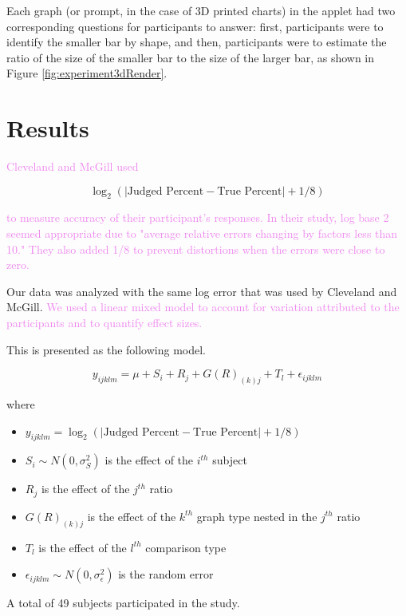 \documentclass[letterpaper,inpress,dvipsnames]{jdsart}
\begin{document}
Each graph (or prompt, in the case of 3D printed charts) in the applet had two corresponding questions for participants to answer: first, participants were to identify the smaller bar by shape, and then, participants were to estimate the ratio of the size of the smaller bar to the size of the larger bar, as shown in Figure \ref{fig:experiment3dRender}.

\hypertarget{results}{%
\section{Results}\label{results}}

{\textcolor{Violet}{Cleveland and McGill used }}

\[\log_2(|\text{Judged Percent} - \text{True Percent}|+1/8)\]

{\textcolor{Violet}{to measure accuracy of their participant's responses. In their study, log base 2 seemed appropriate due to "average relative errors changing by factors less than 10." They also added 1/8 to prevent distortions when the errors were close to zero.}}

Our data was analyzed with the same log error that was used by Cleveland and McGill. {\textcolor{Violet}{We used a linear mixed model to account for variation attributed to the participants and to quantify effect sizes.}}

This is presented as the following model.

\[y_{ijklm}=\mu+S_i+R_j+G(R)_{(k)j}+T_l+\epsilon_{ijklm}\]

\noindent where

\begin{itemize}
\item
  \(y_{ijklm}=\log_2(|\text{Judged Percent} - \text{True Percent}|+1/8)\)
\item
  \(S_i\sim N(0,\sigma^2_S)\) is the effect of the \(i^{th}\) subject
\item
  \(R_j\) is the effect of the \(j^{th}\) ratio
\item
  \(G(R)_{(k)j}\) is the effect of the \(k^{th}\) graph type nested in the \(j^{th}\) ratio
\item
  \(T_l\) is the effect of the \(l^{th}\) comparison type
\item
  \(\epsilon_{ijklm}\sim N(0,\sigma^2_\epsilon)\) is the random error
\end{itemize}

A total of 49 subjects participated in the study.
\end{document}
